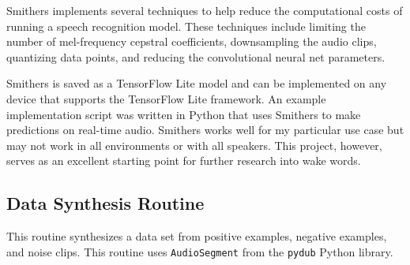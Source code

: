 \documentclass[conference]{IEEEtran}
\newcommand{\code}[1]{\texttt{#1}}
\begin{document}
Smithers implements several techniques to help reduce the computational costs
of running a speech recognition model.
These techniques include limiting the number of mel-frequency cepstral coefficients,
downsampling the audio clips, quantizing data points,
and reducing the convolutional neural net parameters.

Smithers is saved as a TensorFlow Lite model and can be implemented on any device
that supports the TensorFlow Lite framework.
An example implementation script was written in Python
that uses Smithers to make predictions on real-time audio.
Smithers works well for my particular use case but may not work in all environments
or with all speakers.
This project, however, serves as an excellent starting point for further research into wake words.




\newpage
\onecolumn
{}
\subsection{Data Synthesis Routine}\label{appendix:synthesis}
This routine synthesizes a data set from positive examples, negative examples, and noise clips.
This routine uses \code{AudioSegment} from the \code{pydub} Python library.
\end{document}
